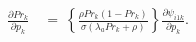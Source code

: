 \begin{align}
    \frac{\partial Pr_{k}}{\partial p_{k}} \
    & = \ \left\{ \frac{\rho Pr_{k} (1 - Pr_{k})}{\sigma (\lambda_{a} Pr_{k} + \rho)} \right\} \frac{\partial \psi_{i1k}}{\partial p_{k}}.
\label{Equation:Equilibrium-Paths_Applying-IFT}
\end{align}
